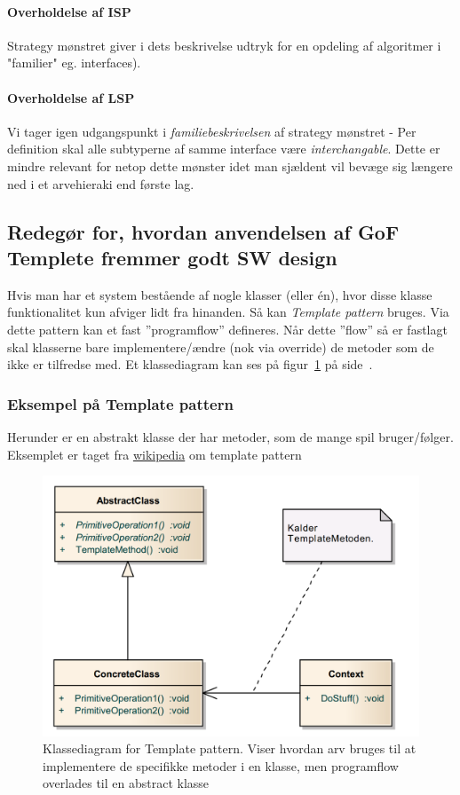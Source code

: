 \paragraph{Overholdelse af ISP}
Strategy mønstret giver i dets beskrivelse udtryk for en opdeling af algoritmer i "familier" eg. interfaces).

\paragraph{Overholdelse af LSP}
Vi tager igen udgangspunkt i \textit{familiebeskrivelsen} af strategy mønstret - Per definition skal alle subtyperne af samme interface være \textit{interchangable}. Dette er mindre relevant for netop dette mønster idet man sjældent vil bevæge sig længere ned i et arvehieraki end første lag.

\subsection{Redegør for, hvordan anvendelsen af GoF Templete fremmer godt SW design}
Hvis man har et system bestående af nogle klasser (eller én), hvor disse klasse funktionalitet kun afviger lidt fra hinanden. Så kan \textit{Template pattern} bruges. Via dette pattern kan et fast ''programflow'' defineres. Når dette ''flow'' så er fastlagt skal klasserne bare implementere/ændre (nok via override) de metoder som de ikke er tilfredse med. Et klassediagram kan ses på figur~\ref{fig:templateclassdia} på side~\pageref{fig:templateclassdia}.

\subsubsection{Eksempel på Template pattern}\label{sec:template}
Herunder er en abstrakt klasse der har metoder, som de mange spil bruger/følger. Eksemplet er taget fra \href{https://en.wikipedia.org/wiki/Template_method_pattern#Example_in_Java}{wikipedia} om template pattern

\begin{figure}[h]
	\centering
	\includegraphics[width=0.75\linewidth]{figs/template/templateclassdia}
	\caption[Klassediagram for Template pattern]{Klassediagram for Template pattern. Viser hvordan arv bruges til at implementere de specifikke metoder i en klasse, men programflow overlades til en abstract klasse}
	\label{fig:templateclassdia}
\end{figure}


